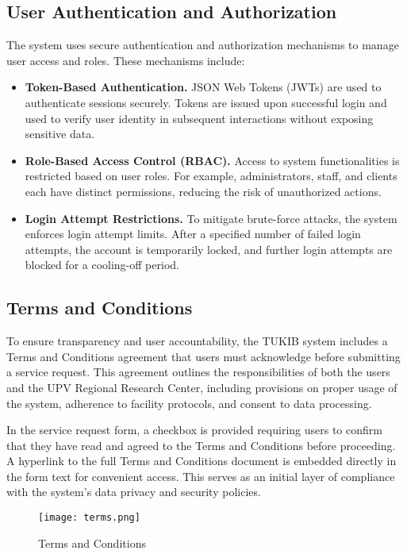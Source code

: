 \subsection{User Authentication and Authorization}

The system uses secure authentication and authorization mechanisms to manage user access and roles. These mechanisms include:

\begin{itemize}
	\item \textbf{Token-Based Authentication.} JSON Web Tokens (JWTs) are used to authenticate sessions securely. Tokens are issued upon successful login and used to verify user identity in subsequent interactions without exposing sensitive data.
	\item \textbf{Role-Based Access Control (RBAC).} Access to system functionalities is restricted based on user roles. For example, administrators, staff, and clients each have distinct permissions, reducing the risk of unauthorized actions.
	\item \textbf{Login Attempt Restrictions.} To mitigate brute-force attacks, the system enforces login attempt limits. After a specified number of failed login attempts, the account is temporarily locked, and further login attempts are blocked for a cooling-off period.
\end{itemize}

\subsection{Terms and Conditions}

To ensure transparency and user accountability, the TUKIB system includes a Terms and Conditions agreement that users must acknowledge before submitting a service request. This agreement outlines the responsibilities of both the users and the UPV Regional Research Center, including provisions on proper usage of the system, adherence to facility protocols, and consent to data processing.

In the service request form, a checkbox is provided requiring users to confirm that they have read and agreed to the Terms and Conditions before proceeding. A hyperlink to the full Terms and Conditions document is embedded directly in the form text for convenient access. This serves as an initial layer of compliance with the system’s data privacy and security policies.

\begin{figure}[h]
	\centering
	\texttt{[image: terms.png]}
	\caption{Terms and Conditions}
	\label{fig:terms}
\end{figure}

